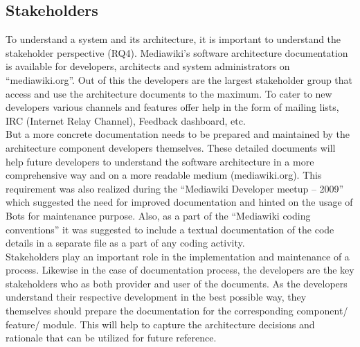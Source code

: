 \subsection{Stakeholders}
\indent To understand a system and its architecture, it is important to understand the stakeholder perspective (RQ4).  Mediawiki's software architecture documentation is available for developers, architects and system administrators on \enquote{mediawiki.org}. Out of this the developers are the largest stakeholder group that access and use the architecture documents to the maximum. To cater to new developers various channels and features offer help in the form of mailing lists, IRC (Internet Relay Channel), Feedback dashboard, etc. 
\\\indent But a more concrete documentation needs to be prepared and maintained by the architecture component developers themselves. These detailed documents will help future developers to understand the software architecture in a more comprehensive way and on a more readable medium (mediawiki.org). This requirement was also realized during the \enquote{Mediawiki Developer meetup – 2009} which suggested the need for improved documentation and hinted on the usage of Bots for maintenance purpose.
Also, as a part of the \enquote{Mediawiki coding conventions} it was suggested to include a textual documentation of the code details in a separate file as a part of any coding activity.
\\\indent Stakeholders play an important role in the implementation and maintenance of a process. Likewise in the case of documentation process, the developers are the key stakeholders who as both provider and user of the documents. As the developers understand their respective development in the best possible way, they themselves should prepare the documentation for the corresponding component/ feature/ module. This will help to capture the architecture decisions and rationale that can be utilized for future reference.
